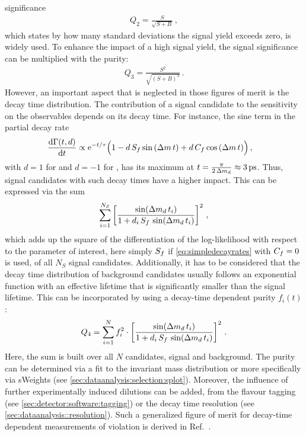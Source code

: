 significance
\begin{align}
	Q_2 = \frac{S}{\sqrt{S + B}}\,,
\end{align}
which states by how many standard deviations the signal yield exceeds zero, is
widely used. To enhance the impact of a high signal yield, the signal
significance can be multiplied with the purity:
\begin{align}
	Q_3 = \frac{S^2}{\sqrt{(S + B)^3}}\,.
\end{align}
However, an important aspect that is neglected in those figures of merit is
the decay time distribution. The contribution of a signal candidate to the
sensitivity on the \CP observables depends on its decay time. For instance,
the sine term in the partial decay rate
\begin{equation}
\begin{aligned}
  \frac{\mathrm{d}\Gamma(t,d)}{\mathrm{d}t}
  &\propto \mathrm{e}^{-t/\tau}
    \Big(
      1
      - d\, \Sf \sin{\left(\dm\,t\right)}
      + d\, \Cf \cos{\left(\dm\,t\right)}
    \Big)\,,
\end{aligned}
\label{eq:simpledecayrates}
\end{equation}
with $d = \num{+1}$ for \Bd and $d = \num{-1}$ for \Bdb, has its maximum at $t
= \frac{\pi}{2\,\dmd} \approx \SI{3}{\ps}$. Thus, signal candidates with such
decay times have a higher impact. This can be expressed via the sum
\begin{align}
	\sum_{i=1}^{N_S} \left[\frac{\sin({\Delta m_{{d}}}\,t_i)}{1 + d_i\,S_f\,\sin({\Delta m_{{d}}}\,t_i)}\right]^2\,,
\end{align}
which adds up the square of the differentiation of the log-likelihood
with respect to the parameter of interest, here simply $S_{f}$ if
\cref{eq:simpledecayrates} with $C_{f} = 0$ is used, of all
$N_S$ signal candidates. Additionally, it has to be considered that the decay
time distribution of background candidates usually follows an exponential
function with an effective lifetime that is significantly smaller than the \Bd
signal lifetime. This can be incorporated by using a decay-time dependent
purity $f_i(t)$:
\begin{align}
	Q_4 = \sum_{i=1}^{N} f_i^2 \cdot \left[\frac{\sin({\Delta m_{{d}}}\,t_i)}{1 + d_i\,S_f\,\sin({\Delta m_{{d}}}\,t_i)}\right]^2\,.
\end{align}
Here, the sum is built over all $N$ candidates, signal and background. The
purity can be determined via a fit to the invariant mass distribution or more
specifically via sWeights (see \cref{sec:dataanalysis:selection:splot}).
Moreover, the influence of further experimentally induced dilutions can be
added, \eg from the flavour tagging (see \cref{sec:detector:software:tagging})
or the decay time resolution (see \cref{sec:dataanalysis::resolution}). Such a
generalized figure of merit for decay-time dependent measurements of
\CP violation is derived in Ref.~\cite{FOM}.